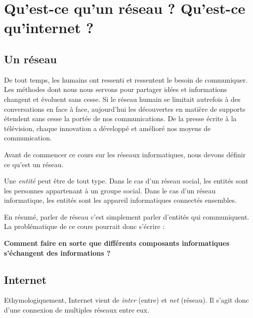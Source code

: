 \section{Qu'est-ce qu'un réseau ? Qu'est-ce qu'internet ?}
\subsection{Un réseau}

De tout temps, les humains ont ressenti et ressentent le besoin de communiquer.
Les méthodes dont nous nous servons pour partager idées et informations changent et évoluent sans cesse. Si le réseau humain se limitait autrefois à des conversations en face à face, aujourd'hui les découvertes en matière de supports étendent sans cesse la portée de nos communications. De la presse écrite à la télévision, chaque innovation a développé et amélioré nos moyens de communication.

Avant de commencer ce cours sur les réseaux informatiques, nous devons définir ce qu'est un réseau.

Une \textit{entité} peut être de tout type. Dans le cas d'un réseau social, les entités sont les personnes appartenant à un groupe social. Dans le cas d'un réseau informatique, les entités sont les appareil informatiques connectés ensembles.

En résumé, parler de réseau c'est simplement parler d'entités qui communiquent. La problématique de ce cours pourrait donc s'écrire :

\textbf{Comment faire en sorte que différents composants informatiques s'échangent des informations ? }

\subsection{Internet}

Ethymologiquement, Internet vient de \textit{inter} (entre) et \textit{net} (réseau). Il s'agit donc d'une connexion de multiples réseaux entre eux.




